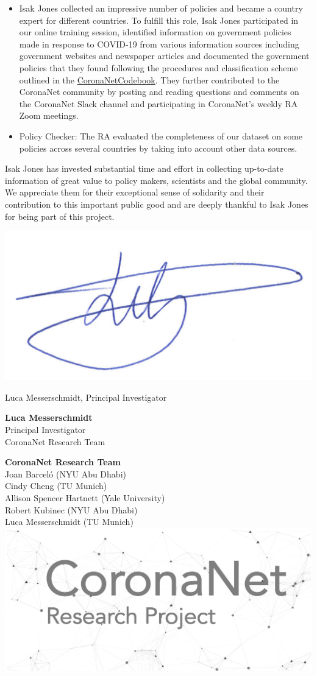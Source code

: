 \documentclass[
]{article}
\begin{document}
\begin{itemize}
\item
  Isak Jones collected an impressive number of policies and became a
  country expert for different countries. To fulfill this role, Isak
  Jones participated in our online training session, identified
  information on government policies made in response to COVID-19 from
  various information sources including government websites and
  newspaper articles and documented the government policies that they
  found following the procedures and classification scheme outlined in
  the
  \href{https://docs.google.com/document/d/1zvNMpwj0onFvUZ_gLl4RRjqS-clbHv3TIX6EOHofsME/edit?usp=sharing}{CoronaNetCodebook}.
  They further contributed to the CoronaNet community by posting and
  reading questions and comments on the CoronaNet Slack channel and
  participating in CoronaNet's weekly RA Zoom meetings.
\item
  Policy Checker: The RA evaluated the completeness of our dataset on
  some policies across several countries by taking into account other
  data sources.
\end{itemize}

Isak Jones has invested substantial time and effort in collecting
up-to-date information of great value to policy makers, scientists and
the global community. We appreciate them for their exceptional sense of
solidarity and their contribution to this important public good and are
deeply thankful to Isak Jones for being part of this project.

\vspace{1cm}

\includegraphics[width=0.2\linewidth]{unterschrift_LM}

Luca Messerschmidt, Principal Investigator

\fontsize{12}{4}\selectfont
\vspace{0.3cm}
\setlength{\baselineskip}{0.5cm}

\textbf{Luca Messerschmidt}\\
Principal Investigator\\
CoronaNet Research Team

\vspace{0.1cm}

\textbf{CoronaNet Research Team}\\
Joan Barceló (NYU Abu Dhabi)\\
Cindy Cheng (TU Munich)\\
Allison Spencer Hartnett (Yale University)\\
Robert Kubinec (NYU Abu Dhabi)\\
Luca Messerschmidt (TU Munich)\\

\includegraphics[width=0.4\linewidth]{logo_wide}
\end{document}
